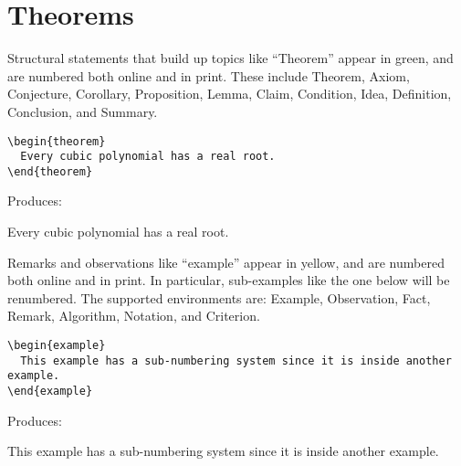 \documentclass{ximera}
\begin{document}
\section{Theorems} \label{TheoremEnvironments}

\begin{example} Structural statements that build up topics like ``Theorem'' appear in green, and are numbered both online and in print. These include Theorem, Axiom, Conjecture, Corollary, Proposition, Lemma, Claim, Condition, Idea, Definition, Conclusion, and Summary.

\begin{verbatim}
\begin{theorem} 
  Every cubic polynomial has a real root. 
\end{theorem}
\end{verbatim}

Produces:

\begin{theorem} 
  Every cubic polynomial has a real root. 
\end{theorem}
\end{example}

\begin{example} Remarks and observations like ``example'' appear in yellow, and are numbered both online and in print. In particular, sub-examples like the one below will be renumbered. The supported environments are: Example, Observation, Fact, Remark, Algorithm, Notation, and Criterion.

\begin{verbatim}
\begin{example}
  This example has a sub-numbering system since it is inside another example.
\end{example}
\end{verbatim}

Produces:

\begin{example}
  This example has a sub-numbering system since it is inside another example.
\end{example}
\end{example}
\end{document}
